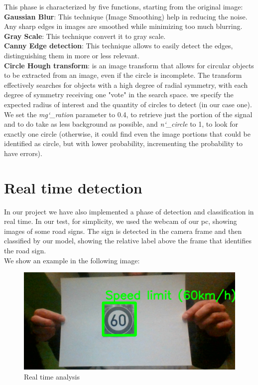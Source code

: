 This phase is characterized by five functions, starting from the original image:\\
\newline
\textbf{Gaussian Blur}: This technique (Image Smoothing) help in reducing the noise. Any sharp edges in images are smoothed while minimizing too much blurring.\\
\newline
\textbf{Gray Scale}: This technique convert it to gray scale.\\
\newline
\textbf{Canny Edge detection}: This technique allows to easily detect the edges, distinguishing them in more or less relevant.\\
\newline
\textbf{Circle Hough transform}: is an image transform that allows for circular objects to be extracted from an image, even if the circle is incomplete. The transform effectively searches for objects with a high degree of radial symmetry, with each degree of symmetry receiving one "vote" in the search space. we specify the expected radius of interest and the quantity of circles to detect (in our case one). We set the \textit{mg\char`_ration} parameter to 0.4, to retrieve just the portion of the signal and to do take as less background as possible, and \textit{n\char`_circle} to 1, to look for exactly one circle (otherwise, it could find even the image portions that could be identified as circle, but with lower probability, incrementing the probability to have errors).

\section{Real time detection}

In our project we have also implemented a phase of detection and classification in real time. In our test, for simplicity, we used the webcam of our pc, showing images of some road signs. The sign is detected in the camera frame and then classified by our model, showing the relative label above the frame that identifies the road sign.\\
\newline
We show an example in the following image:
\begin{figure}[!ht]
	\includegraphics[width=\linewidth]{img/real.PNG} %
	\caption{Real time analysis} %
\end{figure}

